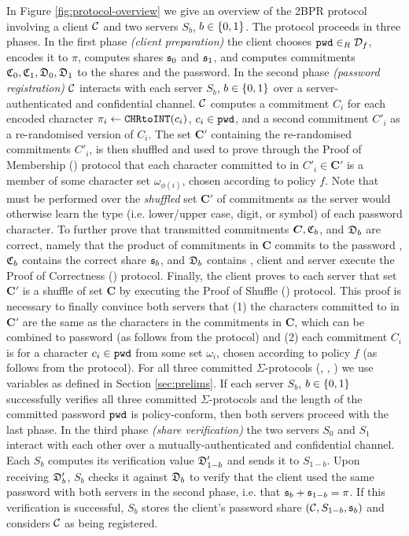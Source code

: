 In Figure \ref{fig:protocol-overview} we give an overview of the 2BPR protocol involving a client $\mathcal{C}$ and two servers $S_b$, $b\in\{0,1\}$.
The protocol proceeds in three phases.
In the first phase \emph{(client preparation)} the client chooses $\mathtt{pwd}\in_R\mathcal{D}_f$, encodes it to $\pi$, computes shares $\mathfrak{s}_{0}$ and $\mathfrak{s}_{1}$, and computes commitments $\mathfrak{C}_0, \mathfrak{C}_1, \mathfrak{D}_0, \mathfrak{D}_1$ to the shares and the password.
In the second phase \emph{(password registration)} $\mathcal{C}$ interacts with each server $S_b$, $b\in\{0,1\}$ over a server-authenticated and confidential channel. $\mathcal{C}$ computes a commitment $C_i$ for each encoded character $\pi_i\gets\texttt{CHRtoINT}(c_i)$, $c_i\in\mathtt{pwd}$, and a second commitment $C'_i$ as a re-randomised version of $C_i$.
The set $\bm C'$ containing the re-randomised commitments $C'_i$, is then shuffled and used to prove through the Proof of Membership (\PoM) protocol that each character committed to in $C'_i\in\bm C'$ is a member of some character set $\omega_{\phi(i)}$, chosen according to policy $f$.
Note that \PoM must be performed over the \emph{shuffled} set $\bm C'$ of commitments as the server would otherwise learn the type (i.e. lower/upper case, digit, or symbol) of each password character.
To further prove that transmitted commitments ${\bm C}, \mathfrak{C}_b$, and $\mathfrak{D}_b$ are correct, namely that the product of commitments in $\bm C$ commits to the password \pwd, $\mathfrak{C}_b$ contains the correct share $\mathfrak{s}_b$, and $\mathfrak{D}_b$ contains \pwd, client and server execute the Proof of Correctness (\PoC) protocol. 
Finally, the client proves to each server that set $\bm C'$ is a shuffle of set $\bm C$ by executing the Proof of Shuffle (\PoS) protocol. 
This proof is necessary to finally convince both servers that 
(1) the characters committed to in $\bm C'$ are the same as the characters in the commitments in $\bm C$, which can be combined to password \pwd (as follows from the \PoC protocol) and 
(2) each commitment $C_i$ is for a character $c_i\in\mathtt{pwd}$ from some set $\omega_{i}$, chosen according to policy $f$ (as follows from the \PoM protocol).  
For all three committed $\Sigma$-protocols (\PoM, \PoC, \PoS) we use variables as defined in Section \ref{sec:prelims}.
If each server $S_b$, $b\in\{0,1\}$ successfully verifies all three committed $\Sigma$-protocols and the length of the committed password $\mathtt{pwd}$ is policy-conform, then both servers proceed with the last phase. In the third phase \emph{(share verification)} the two servers $S_0$ and $S_1$ interact with each other over a mutually-authenticated and confidential channel. Each $S_b$ computes its verification value $\mathfrak{D}'_{1-b}$ and sends it to $S_{1-b}$.
Upon receiving $\mathfrak{D}'_{b}$, $S_b$ checks it against $\mathfrak{D}_b$ to verify that the client used the same password with both servers in the second phase, i.e. that $\mathfrak{s}_b+\mathfrak{s}_{1-b}=\pi$.
If this verification is successful, $S_b$ stores the client's password share $(\mathcal{C},S_{1-b},\mathfrak{s}_b)$ and considers $\mathcal{C}$ as being registered.

